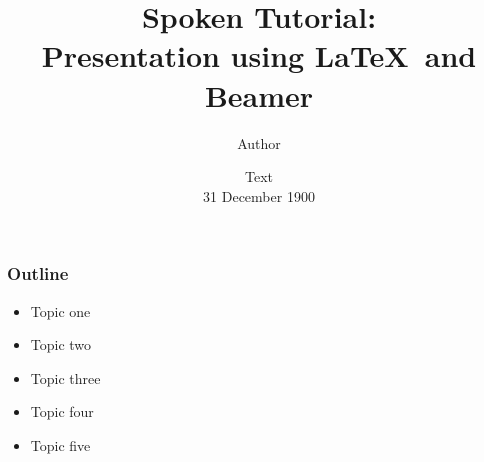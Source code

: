 \documentclass{beamer}
\begin{document}
\sffamily \bfseries %

\title[Presentation using \LaTeX\ and Beamer\hspace{0.5cm}\insertframenumber/\inserttotalframenumber]{Spoken Tutorial:\\Presentation using \LaTeX\ and Beamer} %


\author[What should be printed]{Author} %



\date{Text\\ 31 December 1900}

\begin{frame}
	\titlepage
\end{frame}

\begin{frame}
\frametitle{Outline}
\begin{itemize}
\item{Topic one}
\item{Topic two}
\item{Topic three}
\item{Topic four}
\item{Topic five}
\end{itemize}
\end{frame}
\end{document}
